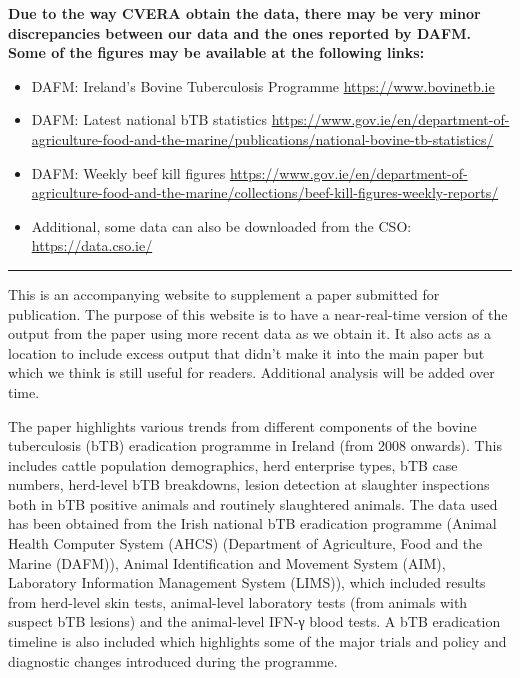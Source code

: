 \documentclass[
  letterpaper,
  DIV=11,
  numbers=noendperiod]{scrreprt}
\providecommand{\tightlist}{%
  \setlength{\itemsep}{0pt}\setlength{\parskip}{0pt}}
\begin{document}
\begin{tcolorbox}[enhanced jigsaw, colbacktitle=quarto-callout-important-color!10!white, opacitybacktitle=0.6, colback=white, breakable, coltitle=black, colframe=quarto-callout-important-color-frame, arc=.35mm, leftrule=.75mm, rightrule=.15mm, toprule=.15mm, bottomtitle=1mm, toptitle=1mm, opacityback=0, title=\textcolor{quarto-callout-important-color}{\faExclamation}\hspace{0.5em}{Official DAFM figures}, bottomrule=.15mm, left=2mm, titlerule=0mm]

\textbf{Due to the way CVERA obtain the data, there may be very minor
discrepancies between our data and the ones reported by DAFM. Some of
the figures may be available at the following links:}

\begin{itemize}
\tightlist
\item
  DAFM: Ireland's Bovine Tuberculosis Programme
  \url{https://www.bovinetb.ie}
\item
  DAFM: Latest national bTB statistics
  \url{https://www.gov.ie/en/department-of-agriculture-food-and-the-marine/publications/national-bovine-tb-statistics/}
\item
  DAFM: Weekly beef kill figures
  \url{https://www.gov.ie/en/department-of-agriculture-food-and-the-marine/collections/beef-kill-figures-weekly-reports/}
\item
  Additional, some data can also be downloaded from the CSO:
  \url{https://data.cso.ie/}
\end{itemize}

\end{tcolorbox}

\begin{center}\rule{0.5\linewidth}{0.5pt}\end{center}

This is an accompanying website to supplement a paper submitted for
publication. The purpose of this website is to have a near-real-time
version of the output from the paper using more recent data as we obtain
it. It also acts as a location to include excess output that didn't make
it into the main paper but which we think is still useful for readers.
Additional analysis will be added over time.

The paper highlights various trends from different components of the
bovine tuberculosis (bTB) eradication programme in Ireland (from 2008
onwards). This includes cattle population demographics, herd enterprise
types, bTB case numbers, herd-level bTB breakdowns, lesion detection at
slaughter inspections both in bTB positive animals and routinely
slaughtered animals. The data used has been obtained from the Irish
national bTB eradication programme (Animal Health Computer System (AHCS)
(Department of Agriculture, Food and the Marine (DAFM)), Animal
Identification and Movement System (AIM), Laboratory Information
Management System (LIMS)), which included results from herd-level skin
tests, animal-level laboratory tests (from animals with suspect bTB
lesions) and the animal-level IFN-γ blood tests. A bTB eradication
timeline is also included which highlights some of the major trials and
policy and diagnostic changes introduced during the programme.
\end{document}
